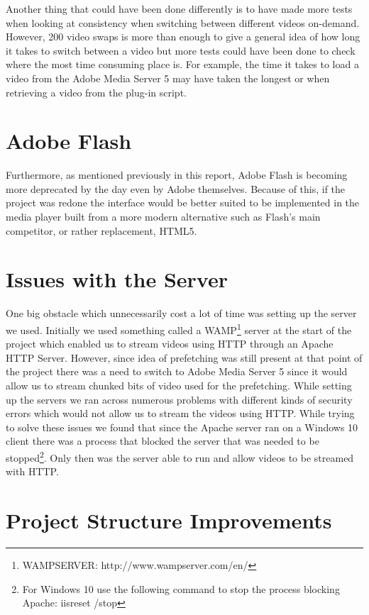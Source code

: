 Another thing that could have been done differently is to have made more tests when looking at consistency when switching between different videos on-demand. However, 200 video swaps is more than enough to give a general idea of how long it takes to switch between a video but more tests could have been done to check where the most time consuming place is. For example, the time it takes to load a video from the Adobe Media Server 5 may have taken the longest or when retrieving a video from the plug-in script.

\section{Adobe Flash}
\label{sec:adobe flash}

Furthermore, as mentioned previously in this report, Adobe Flash is becoming more deprecated by the day even by Adobe themselves. Because of this, if the project was redone the interface would be better suited to be implemented in the media player built from a more modern alternative such as Flash's main competitor, or rather replacement, HTML5.

\section{Issues with the Server}
\label{sec:serverissues}

One big obstacle which unnecessarily cost a lot of time was setting up the server we used. Initially we used something called a WAMP\footnote{WAMPSERVER: http://www.wampserver.com/en/} server at the start of the project which enabled us to stream videos using HTTP through an Apache HTTP Server. However, since idea of prefetching was still present at that point of the project there was a need to switch to Adobe Media Server 5 since it would allow us to stream chunked bits of video used for the prefetching. While setting up the servers we ran across numerous problems with different kinds of security errors which would not allow us to stream the videos using HTTP. While trying to solve these issues we found that since the Apache server ran on a Windows 10 client there was a process that blocked the server that was needed to be stopped\footnote{For Windows 10 use the following command to stop the process blocking Apache: iisreset /stop}. Only then was the server able to run and allow videos to be streamed with HTTP.

\section{Project Structure Improvements}
\label{sec:psi}


